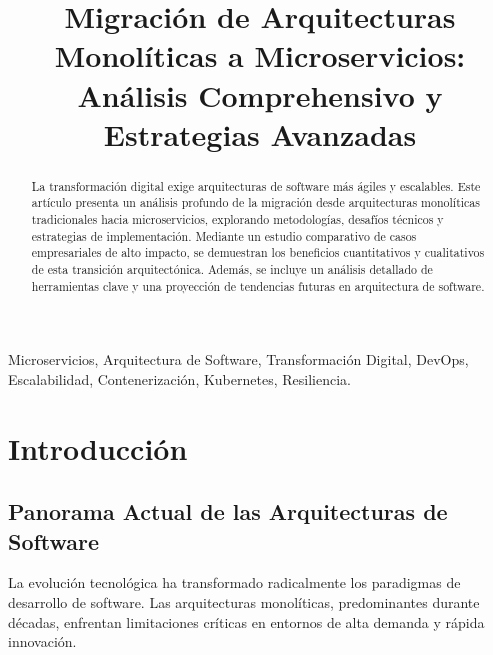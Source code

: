 \documentclass[conference]{IEEEtran}
\begin{document}
\title{Migración de Arquitecturas Monolíticas a Microservicios: \\ Análisis Comprehensivo y Estrategias Avanzadas}

\author{
}

\maketitle

\begin{abstract}
La transformación digital exige arquitecturas de software más ágiles y escalables. Este artículo presenta un análisis profundo de la migración desde arquitecturas monolíticas tradicionales hacia microservicios, explorando metodologías, desafíos técnicos y estrategias de implementación. Mediante un estudio comparativo de casos empresariales de alto impacto, se demuestran los beneficios cuantitativos y cualitativos de esta transición arquitectónica. Además, se incluye un análisis detallado de herramientas clave y una proyección de tendencias futuras en arquitectura de software.
\end{abstract}

\begin{IEEEkeywords}
Microservicios, Arquitectura de Software, Transformación Digital, DevOps, Escalabilidad, Contenerización, Kubernetes, Resiliencia.
\end{IEEEkeywords}

\section{Introducción}

\subsection{Panorama Actual de las Arquitecturas de Software}
La evolución tecnológica ha transformado radicalmente los paradigmas de desarrollo de software. Las arquitecturas monolíticas, predominantes durante décadas, enfrentan limitaciones críticas en entornos de alta demanda y rápida innovación. 

\vspace{1em}
\end{document}
